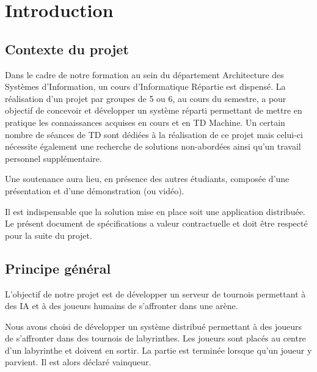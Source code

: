 \chapter{Introduction}

\section{Contexte du projet}


Dans le cadre de notre formation au sein du département Architecture des Systèmes d'Information, un cours d'Informatique Répartie est dispensé. La réalisation d'un projet par groupes de 5 ou 6, au cours du semestre, a pour objectif de concevoir et développer un système réparti permettant de mettre en pratique les connaissances acquises en cours et en TD Machine. Un certain nombre de séances de TD sont dédiées à la réalisation de ce projet mais celui-ci nécessite également une recherche de solutions non-abordées ainsi qu'un travail personnel supplémentaire.

Une soutenance aura lieu, en présence des autres étudiants, composée d'une présentation et d'une démonstration (ou vidéo).

Il est indispensable que la solution mise en place soit une application distribuée. Le présent document de spécifications a valeur contractuelle et doit être respecté pour la suite du projet.

\section{Principe général}


L'objectif de notre projet est de développer un serveur de tournois permettant à des IA et à des joueurs humains de s'affronter dans une arène.

Nous avons choisi de développer un système distribué permettant à des joueurs de s'affronter dans des tournois de labyrinthes. Les joueurs sont placés au centre d'un labyrinthe et doivent en sortir. La partie est terminée lorsque qu'un joueur y parvient. Il est alors déclaré vainqueur.

